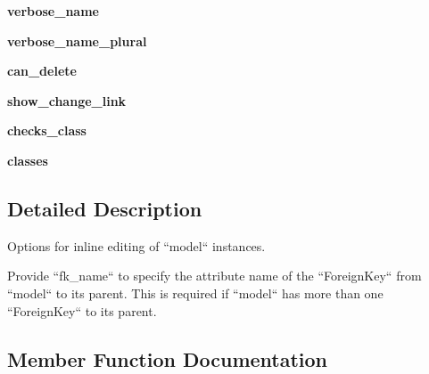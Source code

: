 \begin{DoxyCompactItemize}
{\bfseries verbose\+\_\+name}
\item 
\mbox{\label{classdjango_1_1contrib_1_1admin_1_1options_1_1_inline_model_admin_aafd5fca1ffc615e9c47c44e4ddf680db}} 
{\bfseries verbose\+\_\+name\+\_\+plural}
\item 
\mbox{\label{classdjango_1_1contrib_1_1admin_1_1options_1_1_inline_model_admin_a63d03d9e8eda8b61fde993647630f94b}} 
{\bfseries can\+\_\+delete}
\item 
\mbox{\label{classdjango_1_1contrib_1_1admin_1_1options_1_1_inline_model_admin_a9e36607a9637c3e00fb17fb036a9b3b5}} 
{\bfseries show\+\_\+change\+\_\+link}
\item 
\mbox{\label{classdjango_1_1contrib_1_1admin_1_1options_1_1_inline_model_admin_a7bdadc01d7489475f47ccda3909b5b32}} 
{\bfseries checks\+\_\+class}
\item 
\mbox{\label{classdjango_1_1contrib_1_1admin_1_1options_1_1_inline_model_admin_aad1ddd26629a023af1a3e41c3fbbc5c7}} 
{\bfseries classes}
\end{DoxyCompactItemize}


\subsection{Detailed Description}
\begin{DoxyVerb}Options for inline editing of ``model`` instances.

Provide ``fk_name`` to specify the attribute name of the ``ForeignKey``
from ``model`` to its parent. This is required if ``model`` has more than
one ``ForeignKey`` to its parent.
\end{DoxyVerb}
 

\subsection{Member Function Documentation}
\mbox{\label{classdjango_1_1contrib_1_1admin_1_1options_1_1_inline_model_admin_a7f8c4f1e8b841e4bc36dfcafc5586c76}} 
